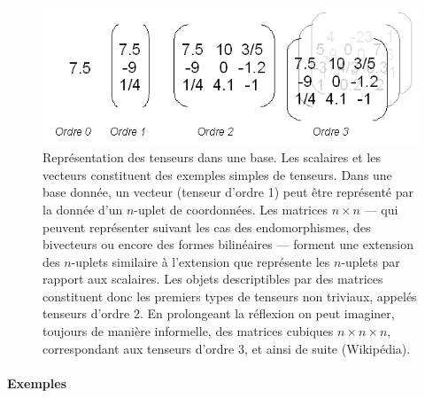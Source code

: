 \documentclass[french]{article}
\theoremstyle{definition}
\begin{document}
\begin{figure}[h!]
  \centering
  \includegraphics[scale=0.5]{figures/Tensor-order-comparison.png}
  \caption{Représentation des tenseurs dans une base. Les scalaires et les vecteurs constituent des exemples simples de tenseurs. Dans une base donnée, un vecteur (tenseur d'ordre 1) peut être représenté par la donnée d'un \(n\)-uplet de coordonnées. Les matrices \(n \times n\) --- qui peuvent représenter suivant les cas des endomorphismes, des bivecteurs ou encore des formes bilinéaires --- forment une extension des \(n\)-uplets similaire à l'extension que représente les \(n\)-uplets par rapport aux scalaires. Les objets descriptibles par des matrices constituent donc les premiers types de tenseurs non triviaux, appelés tenseurs d'ordre 2. En prolongeant la réflexion on peut imaginer, toujours de manière informelle, des matrices cubiques \(n \times n \times n\), correspondant aux tenseurs d'ordre 3, et ainsi de suite (Wikipédia).}
  \label{}
\end{figure}
\paragraph{Exemples}
\end{document}
